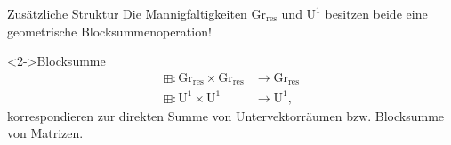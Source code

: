 \documentclass[12pt,utf8,notheorems,compress,t]{beamer}
\renewcommand{\_}{\mathpunct{.}}
\newcommand{\?}{\,{:}\,}
\newcommand{\grres}{\mathrm{Gr}_{\mathrm{res}}}
\begin{document}
\begin{frame}{Zusätzliche Struktur}
    Die Mannigfaltigkeiten $\grres$ und $\mathrm U^1$ besitzen beide eine
    geometrische Blocksummenoperation!
    \begin{block}<2->{Blocksumme}
        \vspace{-1em}
        \begin{align*}
            \boxplus\colon \grres \times \grres &\to \grres \\\boxplus\colon
            \mathrm U^1 \times \mathrm
            U^1 &\to \mathrm U^1,
        \end{align*}
        korrespondieren zur direkten Summe von Untervektorräumen bzw. Blocksumme
        von Matrizen.
    \end{block}
\end{frame}
\end{document}
